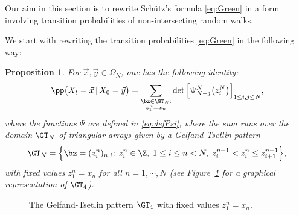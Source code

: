 \documentclass[]{pcmi}
\theoremstyle{plain}
\newtheorem{proposition}[equation]{Proposition}
\theoremstyle{definition}
\begin{document}
Our aim in this section is to rewrite Sch\"{u}tz's formula \eqref{eq:Green} in a form involving transition probabilities of non-intersecting random walks.

We start with rewriting the transition probabilities \eqref{eq:Green} in the following way:

\begin{proposition}\label{p:transitions}
For $\vec x, \vec y \in \Omega_N$, one has the following identity:
\begin{equation}\label{eq:transitions}
	\pp \big(X_t = \vec x\, |\, X_0 = \vec y\big) = \sum_{\substack{\bz \in \GT_N: \\ z_1^{n} = x_n}} \det \Big[\Psi^N_{N-j}\big(z_{i}^N\big)\Big]_{1 \leq i,j \leq N},
\end{equation}
where the functions $\Psi$ are defined in \eqref{eq:defPsi}, where the sum runs over the domain $\GT_N$ of triangular arrays given by a Gelfand-Tsetlin pattern 
\[
	\GT_N = \Big\{\bz = (z_i^n)_{n, i} \colon z_i^n \in \Z,\; 1 \leq i \leq n < N,\; z_i^{n+1} < z_i^{n} \leq z_{i+1}^{n+1} \Big\},
\]
with fixed values $z_1^{n} = x_n$ for all $n=1, \cdots, N$ (see Figure~\ref{fig:GT} for a graphical representation of $\GT_4$).
\end{proposition}
{
\def\Num{4}
\def\StartX{4}
\def\StartY{1}
\begin{figure}
\centering
{}
\caption{The Gelfand-Tsetlin pattern $\GT_4$ with fixed values $z^n_1 = x_n$.}
\label{fig:GT}
\end{figure}
}
\end{document}
